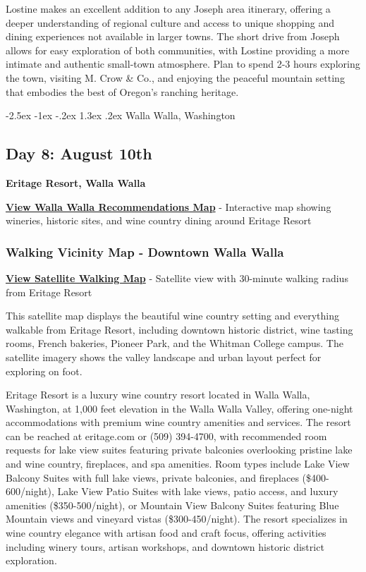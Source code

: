 \documentclass[
  11pt,
  letterpaper,
  DIV=10,
  numbers=noendperiod]{scrartcl}
\makeatletter
\renewcommand{\section}{\@startsection{section}{1}{\z@}%
  {-2.5ex \@plus -1ex \@minus -.2ex}%
  {1.3ex \@plus .2ex}%
  {\normalfont\fontsize{16}{19}\bfseries\color{twinpeaksred}}}
\makeatother
\begin{document}
Lostine makes an excellent addition to any Joseph area itinerary,
offering a deeper understanding of regional culture and access to unique
shopping and dining experiences not available in larger towns. The short
drive from Joseph allows for easy exploration of both communities, with
Lostine providing a more intimate and authentic small-town atmosphere.
Plan to spend 2-3 hours exploring the town, visiting M. Crow \& Co., and
enjoying the peaceful mountain setting that embodies the best of
Oregon's ranching heritage.

\newpage

\section{Walla Walla, Washington}\label{walla-walla-washington}

\subsection{Day 8: August 10th}\label{day-8-august-10th}

\textbf{Eritage Resort, Walla Walla}

\textbf{\href{images/walla_walla_washington_recommendations_map.html}{View
Walla Walla Recommendations Map}} - Interactive map showing wineries,
historic sites, and wine country dining around Eritage Resort

\subsubsection{Walking Vicinity Map - Downtown Walla
Walla}\label{walking-vicinity-map---downtown-walla-walla}

\textbf{\href{images/walla_walla_wa_walking_map.html}{View Satellite
Walking Map}} - Satellite view with 30-minute walking radius from
Eritage Resort

This satellite map displays the beautiful wine country setting and
everything walkable from Eritage Resort, including downtown historic
district, wine tasting rooms, French bakeries, Pioneer Park, and the
Whitman College campus. The satellite imagery shows the valley landscape
and urban layout perfect for exploring on foot.

Eritage Resort is a luxury wine country resort located in Walla Walla,
Washington, at 1,000 feet elevation in the Walla Walla Valley, offering
one-night accommodations with premium wine country amenities and
services. The resort can be reached at eritage.com or (509) 394-4700,
with recommended room requests for lake view suites featuring private
balconies overlooking pristine lake and wine country, fireplaces, and
spa amenities. Room types include Lake View Balcony Suites with full
lake views, private balconies, and fireplaces (\$400-600/night), Lake
View Patio Suites with lake views, patio access, and luxury amenities
(\$350-500/night), or Mountain View Balcony Suites featuring Blue
Mountain views and vineyard vistas (\$300-450/night). The resort
specializes in wine country elegance with artisan food and craft focus,
offering activities including winery tours, artisan workshops, and
downtown historic district exploration.
\end{document}
